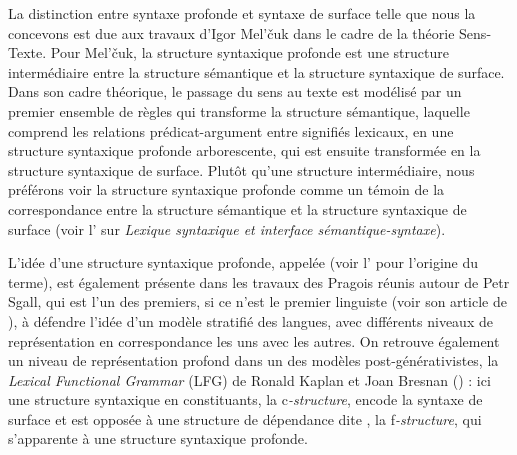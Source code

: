 {La distinction entre syntaxe profonde et syntaxe de surface telle que nous la concevons est due aux travaux d’Igor Mel’čuk dans le cadre de la théorie Sens-Texte. Pour Mel’čuk, la structure syntaxique profonde est une structure intermédiaire entre la structure sémantique et la structure syntaxique de surface. Dans son cadre théorique, le passage du sens au texte est modélisé par un premier ensemble de règles qui transforme la structure sémantique, laquelle comprend les relations prédicat-argument entre signifiés lexicaux, en une structure syntaxique profonde arborescente, qui est ensuite transformée en la structure syntaxique de surface. Plutôt qu’une structure intermédiaire, nous préférons voir la structure syntaxique profonde comme un témoin de la correspondance entre la structure sémantique et la structure syntaxique de surface (voir l’ sur \textit{Lexique syntaxique et interface sémantique-syntaxe}). 

L’idée d’une structure syntaxique profonde, appelée  (voir l’ pour l’origine du terme), est également présente dans les travaux des Pragois réunis autour de Petr Sgall, qui est l’un des premiers, si ce n’est le premier linguiste (voir son article de \citeyear{sgall1967functional}), à défendre l’idée d’un modèle stratifié des langues, avec différents niveaux de représentation en correspondance les uns avec les autres. On retrouve également un niveau de représentation profond dans un des modèles post-générativistes, la \textit{Lexical Functional Grammar} (LFG) de Ronald Kaplan et Joan Bresnan (\citeyear{kaplan1981lexical}) : ici une structure syntaxique en constituants, la c\textit{-structure}, encode la syntaxe de surface et est opposée à une structure de dépendance dite , la f\textit{-structure}, qui s’apparente à une structure syntaxique profonde.

}
